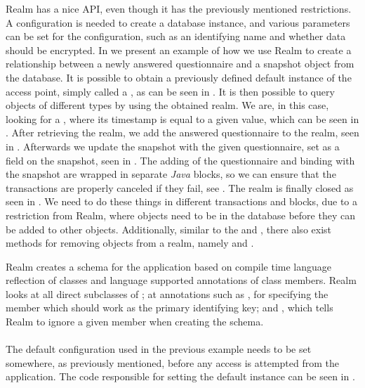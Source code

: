 Realm has a nice API, even though it has the previously mentioned restrictions. A configuration is needed to create a database instance, and various parameters can be set for the configuration, such as an identifying name and whether data should be encrypted. In  we present an example of how we use Realm to create a relationship between a newly answered questionnaire and a snapshot object from the database. It is possible to obtain a previously defined default instance of the access point, simply called a , as can be seen in . It is then possible to query objects of different types by using the obtained realm. We are, in this case, looking for a , where its timestamp is equal to a given value, which can be seen in . After retrieving the realm, we add the answered questionnaire to the realm, seen in . Afterwards we update the snapshot with the given questionnaire, set as a field on the snapshot, seen in . The adding of the questionnaire and binding with the snapshot are wrapped in separate \emph{Java}  blocks, so we can ensure that the transactions are properly canceled if they fail, see . The realm is finally closed as seen in . We need to do these things in different transactions and  blocks, due to a restriction from Realm, where objects need to be in the database before they can be added to other objects. Additionally, similar to the  and , there also exist methods for removing objects from a realm, namely  and .
\\

\FloatBarrier

Realm creates a schema for the application based on compile time language reflection of classes and language supported annotations of class members. Realm looks at all direct subclasses of ; at annotations such as , for specifying the member which should work as the primary identifying key; and , which tells Realm to ignore a given member when creating the schema.
\\\\
The default configuration used in the previous example needs to be set somewhere, as previously mentioned, before any access is attempted from the application. The code responsible for setting the default instance can be seen in . 

